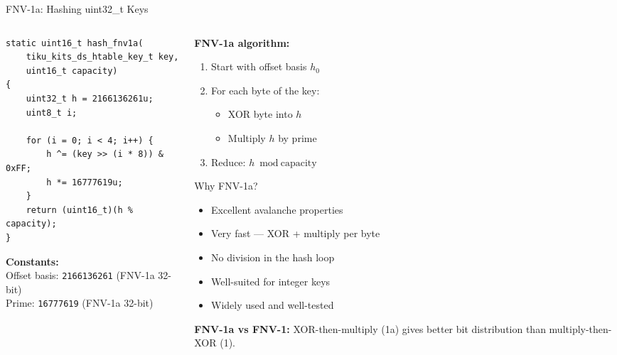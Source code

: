 \documentclass[aspectratio=169, 10pt]{beamer}
\begin{document}
\begin{frame}[fragile]{FNV-1a: Hashing uint32\_t Keys}
\begin{columns}[T]
\begin{column}{0.48\textwidth}
\begin{lstlisting}[style=cstyle,
  title={FNV-1a hash implementation}]
static uint16_t hash_fnv1a(
    tiku_kits_ds_htable_key_t key,
    uint16_t capacity)
{
    uint32_t h = 2166136261u;
    uint8_t i;

    for (i = 0; i < 4; i++) {
        h ^= (key >> (i * 8)) & 0xFF;
        h *= 16777619u;
    }
    return (uint16_t)(h % capacity);
}
\end{lstlisting}

\vspace{0.3em}
\textbf{Constants:}\\
Offset basis: \texttt{2166136261} (FNV-1a 32-bit)\\
Prime: \texttt{16777619} (FNV-1a 32-bit)
\end{column}

\begin{column}{0.48\textwidth}
\textbf{FNV-1a algorithm:}
\begin{enumerate}
  \item Start with offset basis $h_0$
  \item For each byte of the key:
    \begin{itemize}
      \item XOR byte into $h$
      \item Multiply $h$ by prime
    \end{itemize}
  \item Reduce: $h \bmod \text{capacity}$
\end{enumerate}

\vspace{0.5em}
\begin{block}{Why FNV-1a?}
\begin{itemize}
  \item Excellent avalanche properties
  \item Very fast --- XOR + multiply per byte
  \item No division in the hash loop
  \item Well-suited for integer keys
  \item Widely used and well-tested
\end{itemize}
\end{block}

\vspace{0.3em}
\textbf{FNV-1a vs FNV-1:} XOR-then-multiply (1a) gives
better bit distribution than multiply-then-XOR (1).
\end{column}
\end{columns}
\end{frame}
\end{document}
